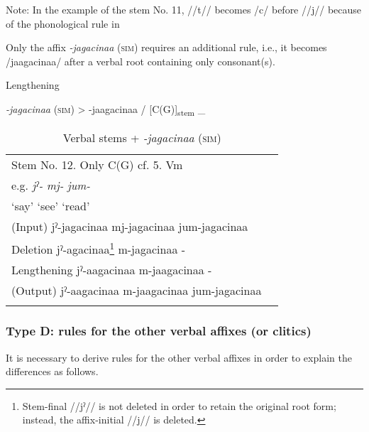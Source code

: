\begin{table}
Note: In the example of the stem No. 11, //t// becomes /c/ before //j// because of the phonological rule in 
\end{table}

Only the affix \textit{-jagacinaa} (\textsc{sim}) requires an additional rule, i.e., it becomes /jaagacinaa/ after a verbal root containing only consonant(s).

\ea\label{ex:8-15}
  Lengthening

  \textit{-jagacinaa} (\textsc{sim})  >  -jaagacinaa  /  [C(G)]\textsubscript{stem}  \_
\z

\begin{table}
\caption{\label{tab:key:63} Verbal stems + \textit{-jagacinaa} (\textsc{sim})}

\begin{tabular}{ll}
\lsptoprule
Stem No.  12. Only C(G)    cf.  5. Vm\\

e.g.  \textit{jˀ-}  \textit{mj-}      \textit{jum-}\\

  ‘say’  ‘see’ ‘read’                                        \\

(Input)  jˀ-jagacinaa  mj-jagacinaa      jum-jagacinaa                                                                                                                              \\
Deletion  jˀ-agacinaa\footnote{Stem-final //jˀ// is not deleted in order to retain the original root form; instead, the affix-initial //j// is deleted.}  m-jagacinaa      -        \\
Lengthening  jˀ-aagacinaa  m-jaagacinaa      -                                                                                                                                      \\
(Output)  jˀ-aagacinaa  m-jaagacinaa      jum-jagacinaa                                                                                                                             \\
\lspbottomrule
\end{tabular}
\end{table}

\subsubsection{Type D: rules for the other verbal affixes (or clitics)}
\label{bkm:Ref347177096}
It is necessary to derive rules for the other verbal affixes in order to explain the differences as follows.

